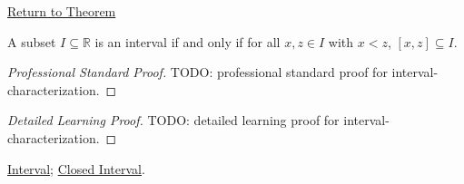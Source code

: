 \newpage
{}
\label{prf:interval-characterization}

\begin{remark*}[Return]
\hyperref[thm:interval-characterization]{Return to Theorem}
\end{remark*}

\begin{theorem*}
A subset $I\subseteq\mathbb{R}$ is an interval if and only if for all $x,z\in I$
with $x<z$, $[x,z]\subseteq I$.
\end{theorem*}

\begin{proof}[Professional Standard Proof]
\LRAProofBodyStart
TODO: professional standard proof for interval-characterization.
\end{proof}

\begin{proof}[Detailed Learning Proof]
\LRAProofBodyStart
TODO: detailed learning proof for interval-characterization.
\end{proof}

\begin{remark*}
\end{remark*}

\begin{dependencies}
\hyperref[def:interval]{Interval};
\hyperref[def:closed-interval]{Closed Interval}.
\end{dependencies}

\clearpage
